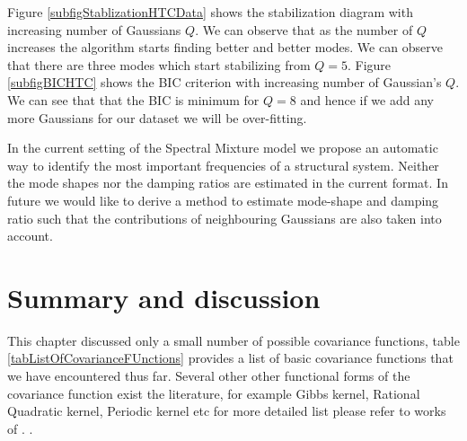 Figure \ref{subfigStablizationHTCData} shows the stabilization diagram with increasing number of Gaussians $Q$. We can observe that as the number of $Q$ increases the algorithm starts finding better and better modes. We can observe that there are three modes which start stabilizing from $Q=5$. Figure \ref{subfigBICHTC} shows the BIC criterion with increasing number of Gaussian's $Q$. We can see that that the BIC is minimum for $Q=8$ and hence if we add any more Gaussians for our dataset we will be  over-fitting. 

In the current setting of the Spectral Mixture model we propose an automatic way to identify the most important frequencies of a structural system. Neither the mode shapes nor the damping ratios are estimated in the current format. In future we would like to derive a method to estimate mode-shape and damping ratio such that the contributions of neighbouring Gaussians are also taken into account. 

\section{Summary and discussion}
This chapter discussed only a small number of possible covariance functions, table \ref{tabListOfCovarianceFUnctions} provides a list of basic covariance functions that we have encountered thus far. Several other other functional forms of the covariance function exist the literature, for example Gibbs kernel, Rational Quadratic kernel, Periodic kernel etc for more detailed list please refer to works of \cite{Rasmussen2005, duvenaud2013structure, wilson2014thesis}. . 

